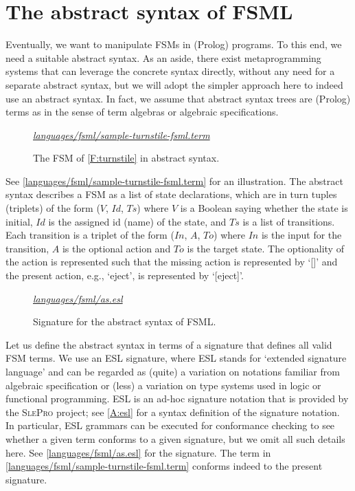 \documentclass[preprint,authoryear,12pt]{noelsarticle}
\newcommand{\m}[1]{\ensuremath{\mathit{#1}}}
\newcommand{\slepro}{\textsc{SlePro}}
\newcommand{\codefigure}[3]{
\begin{figure}[t!]
\begin{boxedminipage}{\hsize}
\mbox{}\hfill{}{\small\textit{\href{http://github.com/slebok/slepro/tree/master/#2}{#2}}}

\end{boxedminipage}
\caption{#1.}
\label{#2}
\medskip
\end{figure}}
\begin{document}
\section{The abstract syntax of FSML}
\label{S:abstract}

Eventually, we want to manipulate FSMs in (Prolog) programs. To this
end, we need a suitable abstract syntax. As an aside, there exist
metaprogramming systems that can leverage the concrete syntax
directly, without any need for a separate abstract syntax, but we will
adopt the simpler approach here to indeed use an abstract syntax. In
fact, we assume that abstract syntax trees are (Prolog) terms as in
the sense of term algebras or algebraic specifications.

\codefigure{%
The FSM of \autoref{F:turnstile} in abstract syntax}{%
languages/fsml/sample-turnstile-fsml.term}{%
prolog}

See \autoref{languages/fsml/sample-turnstile-fsml.term} for an
illustration. The abstract syntax describes a FSM as a list of state
declarations, which are in turn tuples (triplets) of the form (\m{V},
\m{Id}, \m{Ts}) where \m{V} is a Boolean saying whether the state is
initial, \m{Id} is the assigned id (name) of the state, and \m{Ts} is
a list of transitions. Each transition is a triplet of the form
(\m{In}, \m{A}, \m{To}) where \m{In} is the input for the transition,
\m{A} is the optional action and \m{To} is the target state. The
optionality of the action is represented such that the missing action
is represented by `[]' and the present action, e.g., `eject', is
represented by `[eject]'.

\codefigure{%
Signature for the abstract syntax of FSML}{%
languages/fsml/as.esl}{%
esl}

Let us define the abstract syntax in terms of a signature that defines
all valid FSM terms. We use an ESL signature, where ESL stands for
`extended signature language' and can be regarded as (quite) a
variation on notations familiar from algebraic specification or (less)
a variation on type systems used in logic or functional
programming. ESL is an ad-hoc signature notation that is provided by
the \slepro{} project; see \ref{A:esl} for a syntax definition of
the signature notation. In particular, ESL grammars can be executed
for conformance checking to see whether a given term conforms to a
given signature, but we omit all such details here. See
\autoref{languages/fsml/as.esl} for the signature. The term in
\autoref{languages/fsml/sample-turnstile-fsml.term} conforms indeed to
the present signature.
\end{document}
